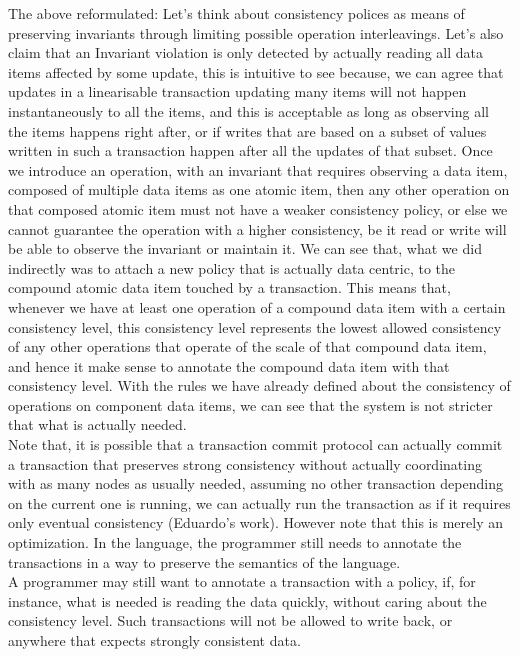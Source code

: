 The above reformulated:
Let's think about consistency polices as means of preserving invariants through 
limiting possible operation interleavings. Let's also claim that an Invariant violation 
is only detected by actually reading all data items affected by some update, this is 
intuitive to see because, we can agree that updates in a linearisable transaction 
updating many items will not happen instantaneously to all the items, and this is 
acceptable as long as observing all the items happens right after, or if writes that 
are based on a subset of values written in such a transaction happen after all the
updates of that subset. Once we introduce an operation, with an invariant that requires 
observing a data item, composed of multiple data items as one atomic item, then any other 
operation on that composed atomic item must not have a weaker consistency policy, or else 
we cannot guarantee the operation with a higher consistency, be it read or write will be
able to observe the invariant or maintain it. We can see that, what we did indirectly was 
to attach a new policy that is actually data centric, to the compound atomic data item 
touched by a transaction. This means that, whenever we have at least one operation of a 
compound data item with a certain consistency level, this consistency level represents 
the lowest allowed consistency of any other operations that operate of the scale of that 
compound data item, and hence it make sense to annotate the compound data item with that
consistency level. With the rules we have already defined about the consistency of 
operations on component data items, we can see that the system is not stricter that what 
is actually needed. \\

Note that, it is possible that a transaction commit protocol can actually commit
a transaction that preserves strong consistency without actually coordinating
with as many nodes as usually needed, assuming no other transaction depending on
the current one is running, we can actually run the transaction as if it
requires only eventual consistency (Eduardo's work). However note that this is
merely an optimization. In the language, the programmer still needs to annotate
the transactions in a way to preserve the semantics of the language. \\

A programmer may still want to annotate a transaction with a policy, if, for
instance, what is needed is reading the data quickly, without caring about the
consistency level. Such transactions will not be allowed to write back, or
anywhere that expects strongly consistent data.




